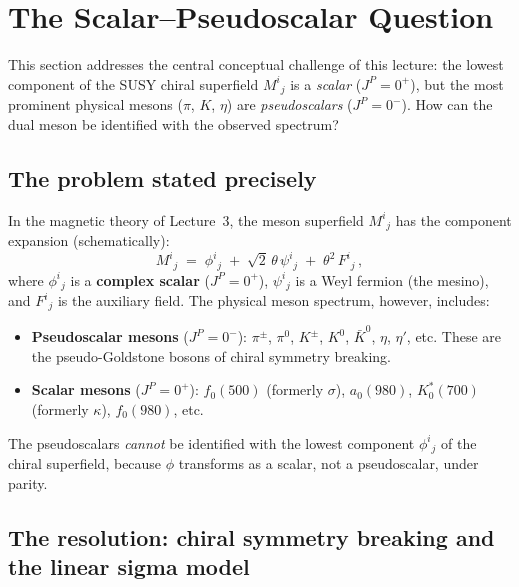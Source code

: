 \documentclass[11pt,a4paper]{article}
\begin{document}
\section{The Scalar--Pseudoscalar Question}
\label{sec:scalar-pseudo}

This section addresses the central conceptual challenge of this lecture:
the lowest component of the SUSY chiral superfield $M^i{}_j$ is a
\emph{scalar} ($J^P = 0^+$), but the most prominent physical mesons
($\pi$, $K$, $\eta$) are \emph{pseudoscalars} ($J^P = 0^-$).  How can
the dual meson be identified with the observed spectrum?

\subsection{The problem stated precisely}

In the magnetic theory of Lecture~3, the meson superfield
$M^i{}_j$ has the component expansion (schematically):
\begin{equation}\label{eq:meson-components}
  M^i{}_j \;=\; \phi^i{}_j \;+\; \sqrt{2}\,\theta\,\psi^i{}_j
  \;+\; \theta^2\, F^i{}_j\,,
\end{equation}
where $\phi^i{}_j$ is a \textbf{complex scalar} ($J^P = 0^+$),
$\psi^i{}_j$ is a Weyl fermion (the mesino), and $F^i{}_j$ is the
auxiliary field.  The physical meson spectrum, however, includes:
\begin{itemize}
  \item \textbf{Pseudoscalar mesons} ($J^P = 0^-$): $\pi^\pm$,
    $\pi^0$, $K^\pm$, $K^0$, $\bar{K}^0$, $\eta$, $\eta'$, etc.
    These are the pseudo-Goldstone bosons of chiral symmetry breaking.
  \item \textbf{Scalar mesons} ($J^P = 0^+$): $f_0(500)$ (formerly
    $\sigma$), $a_0(980)$, $K_0^*(700)$ (formerly $\kappa$),
    $f_0(980)$, etc.
\end{itemize}
The pseudoscalars \emph{cannot} be identified with the lowest component
$\phi^i{}_j$ of the chiral superfield, because $\phi$ transforms as a
scalar, not a pseudoscalar, under parity.


\subsection{The resolution: chiral symmetry breaking and the linear
sigma model}
\label{sec:linear-sigma}
\end{document}
